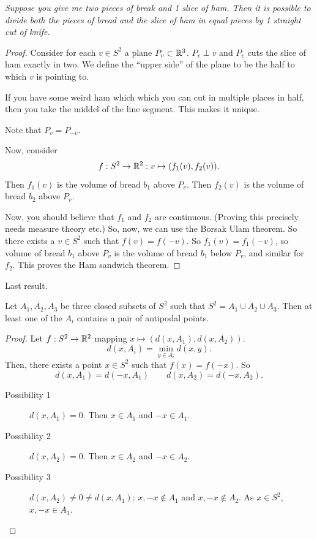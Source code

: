 \begin{theorem}
    \emph{Suppose you give me two pieces of break and 1 slice of ham. Then it is possible to divide both the pieces of bread and the slice of ham in equal pieces by 1 straight cut of knife.}
\end{theorem}
\begin{proof}
    Consider for each $v \in S^{2}$ a plane $P_v \subset \mathbb{R}^3$.
    $P_v \perp v$ and  $P_v$ cuts the slice of ham exactly in two.
    We define the ``upper side'' of the plane to be the half to which $v$ is pointing to.

    If you have some weird ham which which you can cut in multiple places in half, then you take the middel of the line segment. This makes it unique.

    Note that $P_v = P_{-v}$.
\begin{figure}[H]
    \centering
    \label{fig:ham-sandwich-theorem}
\end{figure}

Now, consider 
\[
    f: S^{2} \to  \mathbb{R}^2: v \mapsto (f_1(v), f_2(v))
.\] 
Then $f_1(v)$ is the volume of bread $b_1$ above $P_v$.
Then $f_2(v)$ is the volume of bread $b_2$ above $P_v$.

Now, you should believe that $f_1$ and $f_2$ are continuous. (Proving this precisely needs measure theory etc.)
So, now, we can use the Borsak Ulam theorem.
So there exists a $v \in S^{2}$ such that $f(v) = f(-v)$.
So  $f_1(v) = f_1(-v)$, so volume of bread $b_1$ above $P_v$ is the volume of bread $b_1$ below $P_v$, and similar for  $f_2$.
This proves the Ham sandwich theorem.
\end{proof}

Last result.
\begin{theorem}
    Let $A_1, A_2, A_3$ be three closed subsets of $S^2$ such that $S^2 = A_1 \cup A_2 \cup A_3$.
    Then at least one of the $A_i$ contains a pair of antipodal points.
\end{theorem}
\begin{proof}
    Let $f: S^2 \to \mathbb{R}^2$ mapping $ x\mapsto (d(x, A_1), d(x, A_2))$.
    \[
        d(x, A_i) = \min_{y \in A_i} d(x, y)
    .\] 
    Then, there exists a point $x \in S^2$ such that $f(x) = f(-x)$.
    So
     \[
         d(x, A_1) = d(-x, A_1) \qquad d(x, A_2) = d(-x, A_2)
    .\] 
    \begin{description}
        \item[Possibility 1] $d(x, A_1) = 0$. Then $x \in A_1$ and $-x \in A_1$.
        \item[Possibility 2] $d(x, A_2) = 0$. Then $x \in A_2$ and $-x \in A_2$.
        \item[Possibility 3] $d(x, A_2) \neq 0 \neq d(x, A_1)$: $x, -x \not\in A_1$ and $x, -x \not\in A_2$. As $x \in S^2$, $x, -x \in A_3$.
    \end{description}
\end{proof}

